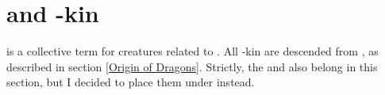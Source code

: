 \begin{comment}
Vaimons belong to the same species as \humans{} and can crossbreed with them. Such a coupling most commonly produces a \human{} child and only rarely (10\% chance) a Vaimon. 

Physically, Vaimons are not easily distinguishable from \humans{}. Metaphysically, however, they are in touch with the forces of Iquin and Nieur in a way that \humans{} are not. This arcane attunement can be detected by an Iquin-Nieur mage after careful study (but not at a glimpse), and it is what defines the Vaimons and separates them from \humans{}. 

\subsubsection{Psychology}

Psychologically, Vaimons are much like \humans{}. 

Vaimons have a strong creative urge and make great craftsmen and artists. Vaimon craftsmanship tends to be not only highly functional but also beautiful and ornate. Especially notable in this regard are architecture and sculpture. Vaimons often build great towers, palaces, statues and the like. An example of a marvel of Vaimon architecture is Martinum Bridge (\ref{Martinum Bridge}). 

Vaimons have an urge to affect and dominate other creatures. They are charismatic and often make capable leaders, but they can also often be tyrannical and/or manipulative. 

\subsubsection{Habitat}
Vaimons are uncommon to rare in all lands of the Old World, save Uzur and Irokas, where they are very rare. 
\end{comment}



%





\newpage
\section{\Dragons{} and \dragon-kin}
 is a collective term for creatures related to \dragons{}. All \dragon-kin are descended from \nagae{}, as described in section \ref{Origin of Dragons}. Strictly, the \nagae{} and \scathae{} also belong in this section, but I decided to place them under  instead. 

